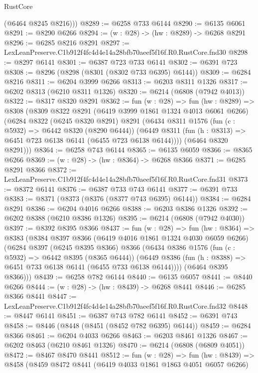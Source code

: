\begin{lexlean}{RustCore}
\begin{coremodule}
        (@6464 @8245 @8216)))
@8289 := @6258 @733 @6144
@8290 := @6135 @6061
@8291 := @8290 @6266
@8294 := (w : @28) -> (hw : @8289) -> @6268 @8291
@8296 := @6285 @8216 @8291
@8297 := LexLeanPreserve.C1b912f4fc4d4e14a28bfb70aeef5f16f.R0.RustCore.fnd30
@8298 := @8297 @6141
@8301 := @6387 @723 @733 @6141
@8302 := @6391 @723
@8308 := @8296 (@8298 (@8301 (@8302 @733 @6395) @6144))
@8309 := @6284 @8216
@8311 := @6204 @3999 @6266
@8313 := @6203 @8311 @1326
@8317 := @6202 @8313 (@6210 @8311 @1326)
@8320 := @6214 (@6808 (@7942 @4013))
@8322 := @8317 @8320 @8291
@8362 := fun (w : @28) =>
  fun (hw : @8289) =>
  @8308
    (@8309
      @8322
      @8291
      (@6419 @3999 @1861 @1324 @4013 @6061 @6266)
      (@6284
        @8322
        (@6245 @8320 @8291)
        @8291
        (@6434
          @8311
          @1576
          (fun (c : @5932) => @6442 @8320 (@8290 @6444))
          (@6449 @8311 (fun (h : @8313) => @6451 @723 @6138 @6141 (@6455 @723 @6138 @6144))))
        (@6464 @8320 @8291)))
@8364 := @6258 @743 @6144
@8365 := @6135 @6059
@8366 := @8365 @6266
@8369 := (w : @28) -> (hw : @8364) -> @6268 @8366
@8371 := @6285 @8291 @8366
@8372 := LexLeanPreserve.C1b912f4fc4d4e14a28bfb70aeef5f16f.R0.RustCore.fnd31
@8373 := @8372 @6141
@8376 := @6387 @733 @743 @6141
@8377 := @6391 @733
@8383 := @8371 (@8373 (@8376 (@8377 @743 @6395) @6144))
@8384 := @6284 @8291
@8386 := @6204 @4016 @6266
@8388 := @6203 @8386 @1326
@8392 := @6202 @8388 (@6210 @8386 @1326)
@8395 := @6214 (@6808 (@7942 @4030))
@8397 := @8392 @8395 @8366
@8437 := fun (w : @28) =>
  fun (hw : @8364) =>
  @8383
    (@8384
      @8397
      @8366
      (@6419 @4016 @1861 @1324 @4030 @6059 @6266)
      (@6284
        @8397
        (@6245 @8395 @8366)
        @8366
        (@6434
          @8386
          @1576
          (fun (c : @5932) => @6442 @8395 (@8365 @6444))
          (@6449 @8386 (fun (h : @8388) => @6451 @733 @6138 @6141 (@6455 @733 @6138 @6144))))
        (@6464 @8395 @8366)))
@8439 := @6258 @782 @6144
@8440 := @6135 @6057
@8441 := @8440 @6266
@8444 := (w : @28) -> (hw : @8439) -> @6268 @8441
@8446 := @6285 @8366 @8441
@8447 := LexLeanPreserve.C1b912f4fc4d4e14a28bfb70aeef5f16f.R0.RustCore.fnd32
@8448 := @8447 @6141
@8451 := @6387 @743 @782 @6141
@8452 := @6391 @743
@8458 := @8446 (@8448 (@8451 (@8452 @782 @6395) @6144))
@8459 := @6284 @8366
@8461 := @6204 @4033 @6266
@8463 := @6203 @8461 @1326
@8467 := @6202 @8463 (@6210 @8461 @1326)
@8470 := @6214 (@6808 (@6809 @4051))
@8472 := @8467 @8470 @8441
@8512 := fun (w : @28) =>
  fun (hw : @8439) =>
  @8458
    (@8459
      @8472
      @8441
      (@6419 @4033 @1861 @1863 @4051 @6057 @6266)

\end{coremodule}
\end{lexlean}
